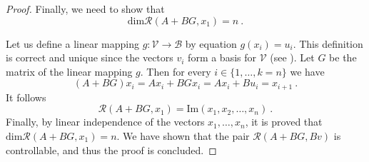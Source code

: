 \begin{proof}
    Finally, we need to show that
    $$\text{dim}\mathcal{R}(A+BG,x_1)=n\ .$$

    Let us define a linear mapping $g\colon\mathcal{V}\to\mathcal{B}$ by equation $g(x_i)=u_i$. This definition is correct and unique since the vectors $v_i$ form a basis for $\mathcal{V}$ (see \cite{Barto}). Let $G$ be the matrix of the linear mapping $g$. Then for every $i\in\{1,\ldots,k=n\}$ we have
    $$(A+BG)x_i=Ax_i+BGx_i=Ax_i+Bu_i=x_{i+1}\ .$$
    It follows 
    $$\mathcal{R}(A+BG,x_1)=\text{Im}(x_1,x_2,\ldots,x_n)\ .$$
    Finally, by linear independence of the vectors $x_1,\ldots,x_n$, it is proved that $\text{dim}\mathcal{R}(A+BG,x_1)=n$. We have shown that the pair $\mathcal{R}(A+BG,Bv)$ is controllable, and thus the proof is concluded.
\end{proof}